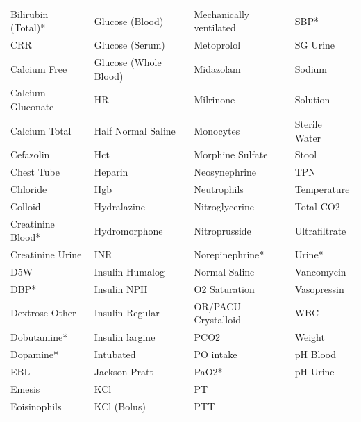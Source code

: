 \documentclass[11pt]{article}
\begin{document}
\begin{table}[htbp]
{\begin{tabular}{llll}
Bilirubin (Total)*   & Glucose (Blood)       & Mechanically ventilated   & SBP*                 \\
CRR                  & Glucose (Serum)       & Metoprolol                & SG Urine             \\
Calcium Free         & Glucose (Whole Blood) & Midazolam                 & Sodium               \\
Calcium Gluconate    & HR                    & Milrinone                 & Solution             \\
Calcium Total        & Half Normal Saline    & Monocytes                 & Sterile Water        \\
Cefazolin            & Hct                   & Morphine Sulfate          & Stool                \\
Chest Tube           & Heparin               & Neosynephrine             & TPN                  \\
Chloride             & Hgb                   & Neutrophils               & Temperature          \\
Colloid              & Hydralazine           & Nitroglycerine            & Total CO2            \\
Creatinine Blood*    & Hydromorphone         & Nitroprusside             & Ultrafiltrate        \\
Creatinine Urine     & INR                   & Norepinephrine*           & Urine*               \\
D5W                  & Insulin Humalog       & Normal Saline             & Vancomycin           \\
DBP*                 & Insulin NPH           & O2 Saturation             & Vasopressin          \\
Dextrose Other       & Insulin Regular       & OR/PACU Crystalloid       & WBC                  \\
Dobutamine*          & Insulin largine       & PCO2                      & Weight               \\
Dopamine*            & Intubated             & PO intake                 & pH Blood             \\
EBL                  & Jackson-Pratt         & PaO2*                      & pH Urine             \\
Emesis               & KCl                   & PT                        &                      \\
Eoisinophils         & KCl (Bolus)           & PTT                       &          \\
\bottomrule
\end{tabular}
}
\end{table}
\end{document}
